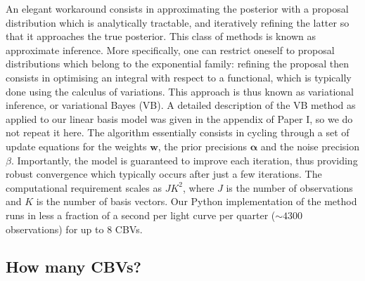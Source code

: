 \documentclass[useAMS,usenatbib]{mn2e}
\begin{document}
An elegant workaround consists in approximating the posterior with a
proposal distribution which is analytically tractable, and iteratively
refining the latter so that it approaches the true posterior. This
class of methods is known as approximate inference. More specifically,
one can restrict oneself to proposal distributions which belong to the
exponential family: refining the proposal then consists in optimising
an integral with respect to a functional, which is typically done
using the calculus of variations. This approach is thus known as
variational inference, or variational Bayes (VB). A detailed
description of the VB method as applied to our linear basis model was
given in the appendix of Paper I, so we do not repeat it here. The
algorithm essentially consists in cycling through a set of update
equations for the weights $\mathbf{w}$, the prior precisions
$\boldsymbol{\alpha}$ and the noise precision $\beta$. Importantly,
the model is guaranteed to improve each iteration, thus providing robust
convergence which typically occurs after just a few 
iterations. The computational requirement scales as $JK^2$, where $J$
is the number of observations and $K$ is the number of basis
vectors. Our {\sc Python} implementation of the method runs in less a fraction of a second per light curve per quarter ($\sim 4300$ observations) for up to 8 CBVs. 

\subsection{How many CBVs?}
\end{document}
